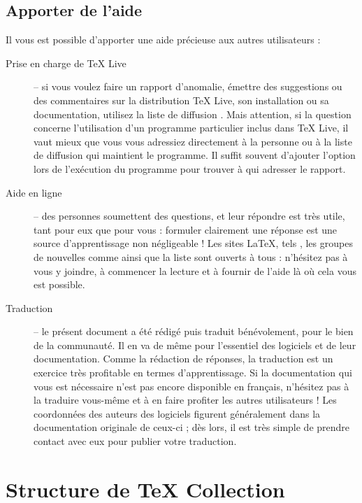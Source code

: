 \documentclass[german, english, french, 12pt]{article}
\renewcommand{\TL}{\TeX{} Live\xspace}%
\renewcommand{\TK}{\TeX{} Collection\xspace}%
\begin{document}
\subsection{Apporter de l'aide}
Il vous est possible d'apporter une aide précieuse aux autres utilisateurs :
\begin{description}
\item[Prise en charge de \TL{}] -- si vous voulez faire un rapport d'anomalie,
  émettre des suggestions ou des commentaires sur la distribution \TL{}, son
  installation ou sa documentation, utilisez la liste de diffusion
  . Mais attention, si la question concerne
  l'utilisation d'un programme particulier inclus dans \TL{}, il vaut mieux que
  vous vous adressiez directement à la personne ou à la liste de diffusion qui
  maintient le programme. Il suffit souvent d'ajouter l'option 
  lors de l'exécution du programme pour trouver à qui adresser le rapport.

\item[Aide en ligne] -- des personnes soumettent des questions, et leur répondre
  est très utile, tant pour eux que pour vous : formuler clairement une réponse
  est une source d'apprentissage non négligeable !  Les sites \LaTeX{}, tels
  , les groupes de nouvelles comme
   ainsi que la liste  sont ouverts à tous :
  n'hésitez pas à vous y joindre, à commencer la lecture et à fournir de l'aide
  là où cela vous est possible.

\item[Traduction] -- le présent document a été rédigé puis traduit bénévolement,
  pour le bien de la communauté. Il en va de même pour l'essentiel des logiciels
  et de leur documentation. Comme la rédaction de réponses, la traduction est un
  exercice très profitable en termes d'apprentissage.  Si la documentation qui
  vous est nécessaire n'est pas encore disponible en français, n'hésitez pas
  à la traduire vous-même et à en faire profiter les autres utilisateurs !  Les
  coordonnées des auteurs des logiciels figurent généralement dans la
  documentation originale de ceux-ci ; dès lors, il est très simple de prendre
  contact avec eux pour publier votre traduction.
\end{description}

\section{Structure de \protect\TK}
\label{sec:overview-tl}
\end{document}
